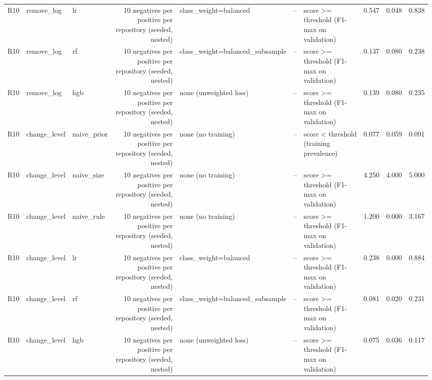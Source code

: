 \begin{table}[htbp]
{\begin{tabular}{lllrlrlrrr}
R10 & remove\_log & lr & 10 negatives per positive per repository (seeded, nested) & class\_weight=balanced & -- & score >= threshold (F1-max on validation) & 0.547 & 0.048 & 0.838 \\
R10 & remove\_log & rf & 10 negatives per positive per repository (seeded, nested) & class\_weight=balanced\_subsample & -- & score >= threshold (F1-max on validation) & 0.137 & 0.080 & 0.238 \\
R10 & remove\_log & hgb & 10 negatives per positive per repository (seeded, nested) & none (unweighted loss) & -- & score >= threshold (F1-max on validation) & 0.139 & 0.080 & 0.235 \\
R10 & change\_level & naive\_prior & 10 negatives per positive per repository (seeded, nested) & none (no training) & -- & score < threshold (training prevalence) & 0.077 & 0.059 & 0.091 \\
R10 & change\_level & naive\_size & 10 negatives per positive per repository (seeded, nested) & none (no training) & -- & score >= threshold (F1-max on validation) & 4.250 & 4.000 & 5.000 \\
R10 & change\_level & naive\_rule & 10 negatives per positive per repository (seeded, nested) & none (no training) & -- & score >= threshold (F1-max on validation) & 1.200 & 0.000 & 3.167 \\
R10 & change\_level & lr & 10 negatives per positive per repository (seeded, nested) & class\_weight=balanced & -- & score >= threshold (F1-max on validation) & 0.238 & 0.000 & 0.884 \\
R10 & change\_level & rf & 10 negatives per positive per repository (seeded, nested) & class\_weight=balanced\_subsample & -- & score >= threshold (F1-max on validation) & 0.081 & 0.020 & 0.231 \\
R10 & change\_level & hgb & 10 negatives per positive per repository (seeded, nested) & none (unweighted loss) & -- & score >= threshold (F1-max on validation) & 0.075 & 0.036 & 0.117 \\
\bottomrule
\end{tabular}}
\end{table}
